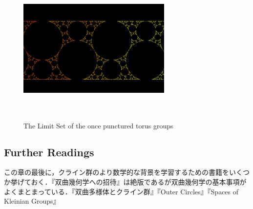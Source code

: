 \begin{figure}[htbp]
 \begin{center}
      \includegraphics[width=3in, height=3in, keepaspectratio]{../img/klein/optg.pdf}
    \caption{The Limit Set of the once punctured torus groups}
    \label{fig:opt}
 \end{center}
\end{figure}

\subsection{Further Readings}
この章の最後に，クライン群のより数学的な背景を学習するための書籍をいくつか挙げておく．『双曲幾何学への招待』\cite{invitation}は絶版であるが双曲幾何学の基本事項がよくまとまっている．『双曲多様体とクライン群』\cite{manifold}『Outer Circles』\cite{outerCircles}『Spaces of Kleinian Groups』\cite{space}